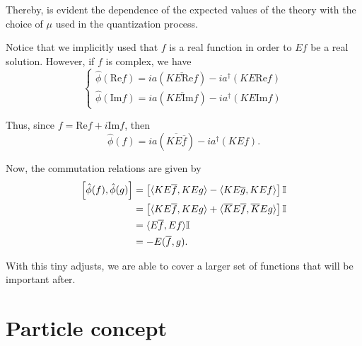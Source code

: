 Thereby, is evident the dependence of the expected values of the theory with the choice of \(\mu\) used in the quantization process.
\begin{remark}
    Notice that we implicitly used that \(f\) is a real function in order to \(Ef\) be a real solution. However, if \(f\) is complex, we have
    \begin{equation}
        \begin{cases}
            \hat{\phi}(\text{Re}f)=ia\left(\overline{KE\text{Re}f}\right)-ia^{\dagger}\left(KE\text{Re}f\right)\\
            \hat{\phi}(\text{Im}f)=ia\left(\overline{KE\text{Im}f}\right)-ia^{\dagger}\left(KE\text{Im}f\right)
        \end{cases}
    \end{equation}

    Thus, since \(f=\text{Re}f+i\text{Im}f\), then
    \begin{equation}
        \hat{\phi}(f)=ia\left(\overline{KE\overline{f}}\right)-ia^{\dagger}\left(KEf\right).
    \end{equation}

    Now, the commutation relations are given by
    \begin{subequations}
        \begin{align}
            \relax\left[\hat{\phi}(f),\hat{\phi}(g)\right]&=\left[\langle KE\overline{f},KEg\rangle-\langle KE\overline{g},KE f\rangle\right]\mathbb{I}\\
            &=\left[\langle KE\overline{f},KEg\rangle+\langle\overline{K}E\overline{f},\overline{K}Eg\rangle\right]\mathbb{I}\\
            &=\langle E\overline{f},Ef\rangle\mathbb{I}\\
            &=-E(\overline{f},g).
        \end{align}
    \end{subequations}

    With this tiny adjusts, we are able to cover a larger set of functions that will be important after.
\end{remark}
\vspace{1mm}
\begin{center}
\end{center}

\chapter{Particle concept}